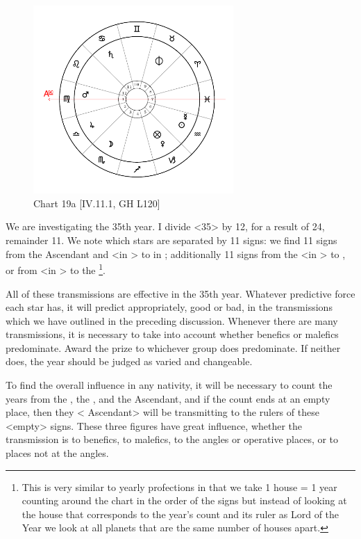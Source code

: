\clearpage
\begin{figure}
\centering
\vspace{-20pt}
\includegraphics[width=0.68\textwidth]{charts/4_11_1}
\caption{Chart 19a [IV.11.1, GH L120]}
\label{fig:chart19a}
\end{figure} 

We are investigating the 35th year. I divide <35> by 12,
for a result of 24, remainder 11. We note which stars are separated by 11 signs: we find 11 signs from the Ascendant and \Mars\xspace <in \Virgo> to \Saturn\xspace in \Cancer; additionally 11 signs from the \Moon\xspace <in \Scorpio> to \Mars, or from \Venus\xspace <in \Capricorn> to the \Moon\footnote{This is very similar to yearly profections in that we take 1 house = 1 year counting around the chart in the order of the signs but instead of looking at the house that corresponds to the year's count and its ruler as Lord of the Year we look at all planets that are the same number of houses apart.}. 

All of these transmissions are effective in the 35th year.
Whatever predictive force each star has, it will predict appropriately, good or bad, in the transmissions which we have outlined in the preceding discussion. Whenever there are many transmissions, it is necessary to take into account whether benefics or malefics predominate. Award the prize to whichever group does predominate. If neither does, the year should be judged as varied and changeable.

To find the overall influence in any nativity, it will be necessary to count the years from the \Sun, the \Moon, and the Ascendant, and if the count ends at an empty place, then they <\Sun\xspace \Moon\xspace Ascendant> will be transmitting to the rulers of these <empty> signs. These three figures have great influence, whether the transmission is to benefics, to malefics, to the angles or operative places, or to places not at the angles.


